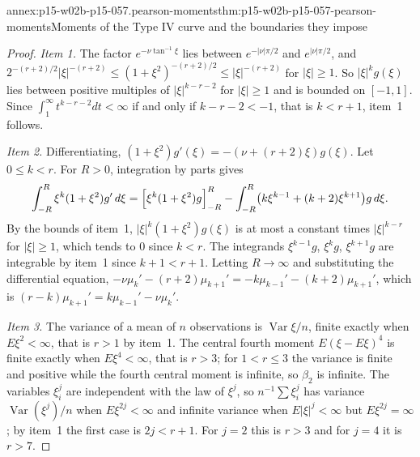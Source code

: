 \begin{annexitem}{annex:p15-w02b-p15-057.pearson-moments}{thm:p15-w02b-p15-057-pearson-moments}{Moments of the Type IV curve and the boundaries they impose}
\begin{proof}
\emph{Item 1.} The factor \(e^{-\nu\tan^{-1}\xi}\) lies between
\(e^{-|\nu|\pi/2}\) and \(e^{|\nu|\pi/2}\), and
\(2^{-(r+2)/2}|\xi|^{-(r+2)}\leq(1+\xi^2)^{-(r+2)/2}\leq|\xi|^{-(r+2)}\)
for \(|\xi|\geq1\). So \(|\xi|^kg(\xi)\) lies between positive multiples of
\(|\xi|^{k-r-2}\) for \(|\xi|\geq1\) and is bounded on \([-1,1]\). Since
\(\int_1^\infty t^{k-r-2}dt<\infty\) if and only if \(k-r-2<-1\), that is
\(k<r+1\), item~1 follows.

\emph{Item 2.} Differentiating,
\((1+\xi^2)g'(\xi)=-(\nu+(r+2)\xi)g(\xi)\). Let \(0\leq k<r\). For
\(R>0\), integration by parts gives
\[
 \int_{-R}^R\xi^k(1+\xi^2)g'\,d\xi
 =\Bigl[\xi^k(1+\xi^2)g\Bigr]_{-R}^R
 -\int_{-R}^R\bigl(k\xi^{k-1}+(k+2)\xi^{k+1}\bigr)g\,d\xi .
\]
By the bounds of item~1, \(|\xi|^k(1+\xi^2)g(\xi)\) is at most a constant
times \(|\xi|^{k-r}\) for \(|\xi|\geq1\), which tends to \(0\) since
\(k<r\). The integrands \(\xi^{k-1}g\), \(\xi^kg\), \(\xi^{k+1}g\) are
integrable by item~1 since \(k+1<r+1\). Letting \(R\to\infty\) and
substituting the differential equation,
\(-\nu\mu_k'-(r+2)\mu_{k+1}'=-k\mu_{k-1}'-(k+2)\mu_{k+1}'\), which is
\((r-k)\mu_{k+1}'=k\mu_{k-1}'-\nu\mu_k'\).

\emph{Item 3.} The variance of a mean of \(n\) observations is
\(\operatorname{Var}\xi/n\), finite exactly when \(E\xi^2<\infty\), that is
\(r>1\) by item~1. The central fourth moment
\(E(\xi-E\xi)^4\) is finite exactly when \(E\xi^4<\infty\), that is
\(r>3\); for \(1<r\leq3\) the variance is finite and positive while the
fourth central moment is infinite, so \(\beta_2\) is infinite. The
variables \(\xi_i^j\) are independent with the law of \(\xi^j\), so
\(n^{-1}\sum\xi_i^j\) has variance \(\operatorname{Var}(\xi^j)/n\) when
\(E\xi^{2j}<\infty\) and infinite variance when \(E|\xi|^j<\infty\) but
\(E\xi^{2j}=\infty\); by item~1 the first case is \(2j<r+1\). For \(j=2\)
this is \(r>3\) and for \(j=4\) it is \(r>7\).


\end{proof}
\end{annexitem}
